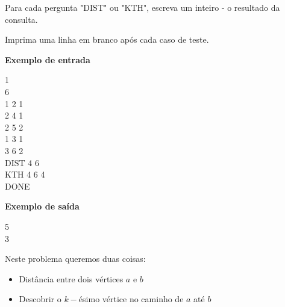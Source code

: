 {\begin{mdframed}[backgroundcolor=blue!5]
Para cada pergunta "DIST" ou "KTH", escreva um inteiro - o resultado da consulta.

Imprima uma linha em branco após cada caso de teste.

\vspace{0.75cm}

\begin{minipage}{.4\linewidth}
    {\large{\textbf{Exemplo de entrada}}}\vspace{0.2cm}
    \begin{mdframed}[backgroundcolor=gray!10]
        \vspace{-0.5cm}
        1\\

        6\\
        1 2 1\\
        2 4 1\\
        2 5 2\\
        1 3 1\\
        3 6 2\\
        DIST 4 6\\
        KTH 4 6 4\\
        DONE
        \vspace{-0.4cm}
    \end{mdframed}
\end{minipage}
\hspace{2cm}
\begin{minipage}{.4\linewidth}
    \vspace{-4.55cm}
    {\large{\textbf{Exemplo de saída}}}\vspace{0.2cm}
    \begin{mdframed}[backgroundcolor=gray!10]
        \vspace{-0.5cm}
        5\\
        3
        \vspace{-0.4cm}
    \end{mdframed}
\end{minipage}%

\vspace{-0.4cm}
\end{mdframed}}

Neste problema queremos duas coisas:

\begin{itemize}
    \item Distância entre dois vértices $a$ e $b$
    \item Descobrir o $k-$ésimo vértice no caminho de $a$ até $b$
\end{itemize}

